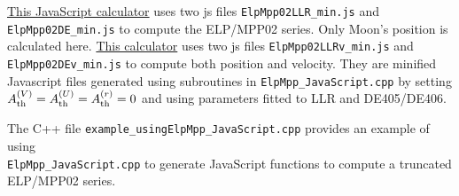 \documentclass[12pt]{article}
\begin{document}
\href{https://ytliu0.github.io/ElpMpp02/ElpMpp02.html}{This JavaScript calculator} 
uses two js files {\tt ElpMpp02LLR\_min.js} and {\tt ElpMpp02DE\_min.js} to 
compute the ELP/MPP02 series. Only Moon's position is calculated here. 
\href{https://ytliu0.github.io/ElpMpp02/ElpMpp02v.html}{This calculator}
uses two js files {\tt ElpMpp02LLRv\_min.js} and {\tt ElpMpp02DEv\_min.js} to
compute both position and velocity. They are minified Javascript files generated using 
subroutines in {\tt ElpMpp\_JavaScript.cpp} by setting $A_{\rm th}^{(V)} = A_{\rm th}^{(U)}
= A_{\rm th}^{(r)} = 0$ and using parameters fitted to LLR and DE405/DE406.

The C++ file {\tt example\_usingElpMpp\_JavaScript.cpp} provides an example 
of using \\ {\tt ElpMpp\_JavaScript.cpp} to generate JavaScript functions to compute
a truncated ELP/MPP02 series.
\end{document}
